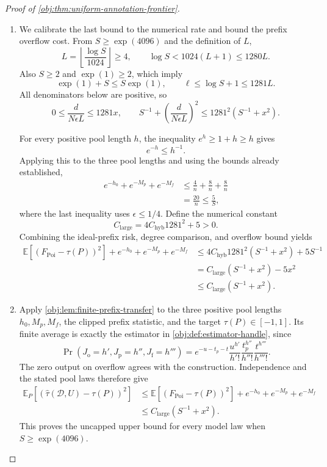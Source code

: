 \begin{proof}[Proof of \cref{obj:thm:uniform-annotation-frontier}]
\begin{enumerate}
\item We calibrate the last bound to the numerical rate and bound the prefix overflow cost. From \(S\ge\exp(4096)\) and the definition of \(L\),
\[
L=\left\lfloor\frac{\log S}{1024}\right\rfloor\ge4,
\qquad
\log S<1024(L+1)\le1280L.
\]
Also \(S\ge2\) and \(\exp(1)\ge2\), which imply
\[
\exp(1)+S\le S\exp(1),
\qquad
\ell\le\log S+1\le1281L.
\]
All denominators below are positive, so
\[
0\le\frac d{N\epsilon L}\le1281x,
\qquad
S^{-1}+\left(\frac d{N\epsilon L}\right)^2
\le1281^2(S^{-1}+x^2).
\]

For every positive pool length \(h\), the inequality \(e^h\ge1+h\ge h\) gives
\[
e^{-h}\le h^{-1}.
\]
Applying this to the three pool lengths and using the bounds already established,
\[
\begin{aligned}
e^{-h_0}+e^{-M_p}+e^{-M_f}
&\le\frac4n+\frac8n+\frac8n\\
&=\frac{20}{n}
\le\frac5S,
\end{aligned}
\]
where the last inequality uses \(\epsilon\le1/4\). Define the numerical constant
\[
C_{\mathrm{large}}=4C_{\mathrm{hyb}}1281^2+5>0.
\]
Combining the ideal-prefix risk, degree comparison, and overflow bound yields
\[
\begin{aligned}
\mathbb E[(F_{\mathrm{Poi}}-\tau(P))^2]
+e^{-h_0}+e^{-M_p}+e^{-M_f}
&\le
4C_{\mathrm{hyb}}1281^2(S^{-1}+x^2)+5S^{-1}\\
&=
C_{\mathrm{large}}(S^{-1}+x^2)-5x^2\\
&\le C_{\mathrm{large}}(S^{-1}+x^2).
\end{aligned}
\]

\item Apply \cref{obj:lem:finite-prefix-transfer} to the three positive pool lengths \(h_0,M_p,M_f\), the clipped prefix statistic, and the target \(\tau(P)\in[-1,1]\). Its finite average is exactly the estimator in \cref{obj:def:estimator-handle}, since
\[
\Pr(J_{\mathrm o}=h',J_{\mathrm p}=h'',J_{\mathrm f}=h''')
=
e^{-u-t_p-t}
\frac{u^{h'}}{h'!}
\frac{t_p^{h''}}{h''!}
\frac{t^{h'''}}{h'''!}.
\]
The zero output on overflow agrees with the construction. Independence and the stated pool laws therefore give
\[
\begin{aligned}
\mathbb E_P[
(\widehat\tau(\mathcal D,U)-\tau(P))^2]
&\le
\mathbb E[(F_{\mathrm{Poi}}-\tau(P))^2]
+e^{-h_0}+e^{-M_p}+e^{-M_f}\\
&\le C_{\mathrm{large}}(S^{-1}+x^2).
\end{aligned}
\]
This proves the uncapped upper bound for every model law when \(S\ge\exp(4096)\).


\end{enumerate}
\end{proof}
